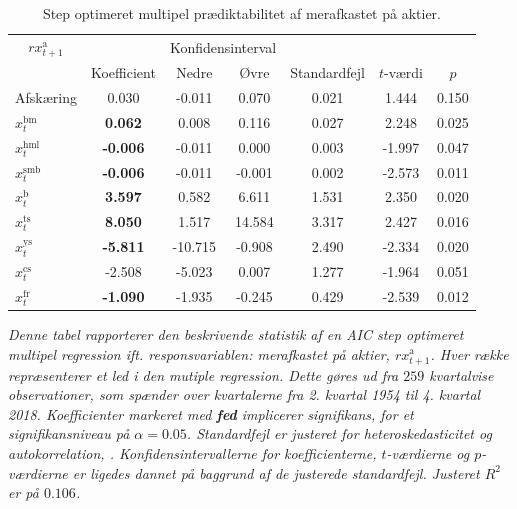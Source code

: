 \documentclass[
  a4paper,
  oneside]{memoir}
\begin{document}
\begin{table}[H]

\caption{\label{tab:MULT-step-ak}Step optimeret multipel prædiktabilitet af merafkastet på aktier.}
\centering
\begin{threeparttable}
\begin{tabular}[t]{lcccccc}
\toprule
\multicolumn{1}{c}{$rx_{t+1}^{\text{a}}$} & \multicolumn{1}{c}{ } & \multicolumn{2}{c}{Konfidensinterval} & \multicolumn{3}{c}{ } \\
\cmidrule(l{3pt}r{3pt}){1-1} \cmidrule(l{3pt}r{3pt}){3-4}
  & Koefficient & Nedre & Øvre & Standardfejl & $t$-værdi & $p$\\
\midrule
\rowcolor{gray!6}  Afskæring & 0.030 & -0.011 & 0.070 & 0.021 & 1.444 & 0.150\\
$x_t^{\text{bm}}$ & \textbf{ 0.062} & 0.008 & 0.116 & 0.027 & 2.248 & 0.025\\
\rowcolor{gray!6}  $x_t^{\text{hml}}$ & \textbf{-0.006} & -0.011 & 0.000 & 0.003 & -1.997 & 0.047\\
$x_t^{\text{smb}}$ & \textbf{-0.006} & -0.011 & -0.001 & 0.002 & -2.573 & 0.011\\
\rowcolor{gray!6}  $x_t^{\text{b}}$ & \textbf{ 3.597} & 0.582 & 6.611 & 1.531 & 2.350 & 0.020\\
$x_t^{\text{ts}}$ & \textbf{ 8.050} & 1.517 & 14.584 & 3.317 & 2.427 & 0.016\\
\rowcolor{gray!6}  $x_t^{\text{ys}}$ & \textbf{-5.811} & -10.715 & -0.908 & 2.490 & -2.334 & 0.020\\
$x_t^{\text{cs}}$ & -2.508 & -5.023 & 0.007 & 1.277 & -1.964 & 0.051\\
\rowcolor{gray!6}  $x_t^{\text{fr}}$ & \textbf{-1.090} & -1.935 & -0.245 & 0.429 & -2.539 & 0.012\\
\bottomrule
\end{tabular}
\begin{tablenotes}
\item \textit{Denne tabel rapporterer den beskrivende statistik af en AIC step optimeret multipel regression ift. responsvariablen: merafkastet på aktier, $rx_{t+1}^{\text{a}}$. Hver række repræsenterer et led i den mutiple regression. Dette gøres ud fra $259$ kvartalvise observationer, som spænder over kvartalerne fra 2. kvartal 1954 til 4. kvartal 2018. Koefficienter markeret med \textbf{fed} implicerer signifikans, for et signifikansniveau på $\alpha=0.05$. Standardfejl er justeret for heteroskedasticitet og autokorrelation, \citep{Newey1987}. Konfidensintervallerne for koefficienterne, $t$-værdierne og $p$-værdierne er ligedes dannet på baggrund af de justerede standardfejl. Justeret $R^2$ er på $0.106$.}
\end{tablenotes}
\end{threeparttable}
\end{table}
\end{document}
